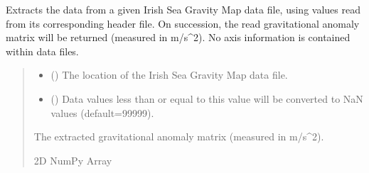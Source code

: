 \documentclass[letterpaper,10pt,english]{sphinxmanual}
\begin{document}
\begin{fulllineitems}
\label{\detokenize{modules/gravity/irish:qnav.gravity.irish.read_irish_gravity_file}}
\pysigstartsignatures
{}
\pysigstopsignatures
\sphinxAtStartPar
Extracts the data from a given Irish Sea Gravity Map data file, using
values read from its corresponding header file. On succession, the read
gravitational anomaly matrix will be returned (measured in m/s\textasciicircum{}2). No axis
information is contained within data files.
\begin{quote}\begin{description}
\begin{itemize}
\item {} 
\sphinxAtStartPar
{} () \textendash{} The location of the Irish Sea Gravity Map data file.

\item {} 
\sphinxAtStartPar
{} () \textendash{} Data values less than or equal to this value will be
converted to NaN values (default=\sphinxhyphen{}99999).

\end{itemize}

\sphinxAtStartPar
The extracted gravitational anomaly matrix (measured in m/s\textasciicircum{}2).

\sphinxAtStartPar
2D NumPy Array

\end{description}\end{quote}

\end{fulllineitems}

\end{document}
